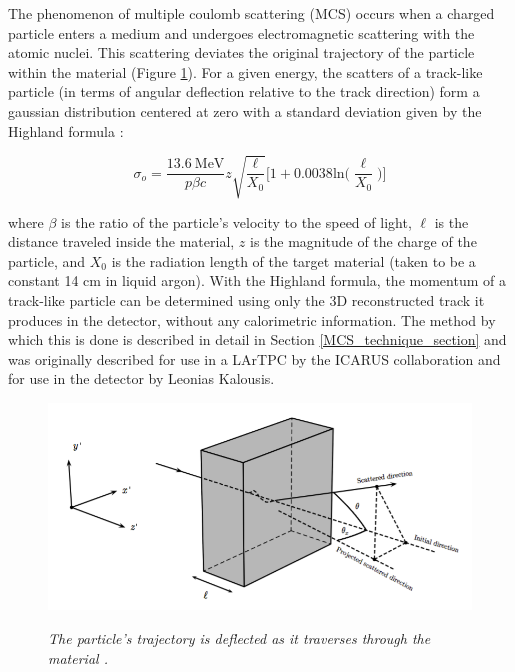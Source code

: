 The phenomenon of multiple coulomb scattering (MCS) occurs when a charged particle enters a medium and undergoes electromagnetic scattering with the atomic nuclei. This scattering deviates the original trajectory of the particle within the material (Figure \ref{mcs_nocap_fig}). For a given energy, the scatters of a track-like particle (in terms of angular deflection relative to the track direction) form a gaussian distribution centered at zero with a standard deviation given by the Highland formula \cite{highland}: 

\begin{equation}
	\sigma_o=\frac{13.6\  \text{MeV}}{p\beta c}z\sqrt{\frac{\ell}{X_0}}\Big[1+0.0038\text{ln}\Big(\frac{\ell}{X_0}\Big)\Big]
\end{equation}\label{highland_eqtn}

\noindent where $\beta$ is the ratio of the particle's velocity to the speed of light, $\ell$ is the distance traveled inside the material, $z$ is the magnitude of the charge of the particle, and $X_0$ is the radiation length of the target material (taken to be a constant 14 cm in liquid argon). With the Highland formula, the momentum of a track-like particle can be determined using only the 3D reconstructed track it produces in the detector, without any calorimetric information. The method by which this is done is described in detail in Section \ref{MCS_technique_section} and was originally described for use in a LArTPC by the ICARUS collaboration\cite{icarus_mcs_paper} and for use in the \ub detector by Leonias Kalousis\cite{leonidas1}.

\begin{figure}[ht!]
\centering
	\includegraphics[width=0.5\linewidth]{Figures/static_figs/mcs_nocap.png} \\
\caption{\textit{The particle's trajectory is deflected as it traverses through the material \cite{leonidas1}.}}\label{mcs_nocap_fig}
\end{figure}